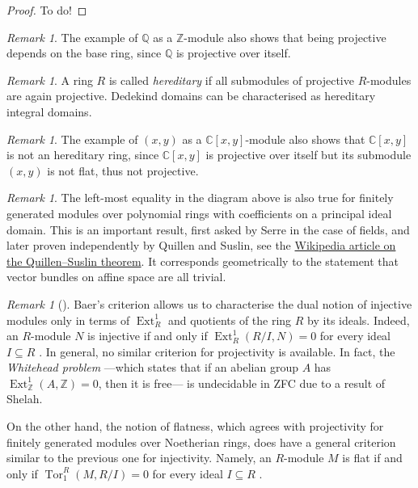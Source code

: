 \documentclass[A4paper, 12pt, british, reqno]{amsart}
\newcommand{\C}{\mathbb{C}} %
\newcommand{\Q}{\mathbb{Q}} %
\newcommand{\Z}{\mathbb{Z}} %
\theoremstyle{plain}
\theoremstyle{definition}
\theoremstyle{remark}
\newtheorem{rem}[thm]{Remark}
\theoremstyle{plain}
\theoremstyle{definition}
\theoremstyle{remark}
\theoremstyle{plain}
\theoremstyle{definition}
\theoremstyle{remark}
\DeclareMathOperator{\Ext}{Ext}
\DeclareMathOperator{\Tor}{Tor}
\begin{document}
{\color{gray}
\begin{proof}
    To do!
\end{proof}
}

\begin{rem}
    The example of $\Q$ as a $\Z$-module also shows that being projective depends on the base ring, since $\Q$ is projective over itself.
\end{rem}

\begin{rem}
    A ring $R$ is called \textit{hereditary} if all submodules of projective $R$-modules are again projective.
    Dedekind domains can be characterised as hereditary integral domains.
\end{rem}

\begin{rem}
    The example of $(x,y)$ as a $\C[x,y]$-module also shows that $\C[x,y]$ is not an hereditary ring, since $\C[x,y]$ is projective over itself but its submodule $(x,y)$ is not flat, thus not projective.
\end{rem}

\begin{rem}
    The left-most equality in the diagram above is also true for finitely generated modules over polynomial rings with coefficients on a principal ideal domain.
    This is an important result, first asked by Serre in the case of fields, and later proven independently by Quillen and Suslin, see the \href{https://en.wikipedia.org/wiki/Quillen-Suslin_theorem}{Wikipedia article on the Quillen--Suslin theorem}.
    It corresponds geometrically to the statement that vector bundles on affine space are all trivial.
\end{rem}

\begin{rem}[{\cite{fra18}}]
    Baer's criterion \cite[Prop.~1.1.1]{fra18} allows us to characterise the dual notion of injective modules only in terms of $\Ext^{1}_{R}$ and quotients of the ring $R$ by its ideals.
    Indeed, an $R$-module $N$ is injective if and only if $\Ext^{1}_{R}(R/I,N)=0$ for every ideal $I\subseteq R$ \cite[Prop.~1.1.4]{fra18}.
    In general, no similar criterion for projectivity is available.
    In fact, the \textit{Whitehead problem} ---which states that if an abelian group $A$ has $\Ext^{1}_{\Z}(A,\Z)=0$, then it is free--- is undecidable in ZFC due to a result of Shelah.

    {\color{gray}
    On the other hand, the notion of flatness, which agrees with projectivity for finitely generated modules over Noetherian rings, does have a general criterion similar to the previous one for injectivity.
    Namely, an $R$-module $M$ is flat if and only if $\Tor_{1}^{R}(M,R/I)=0$ for every ideal $I\subseteq R$ \cite[Prop.~1.2.3]{fra18}.}
\end{rem}
\end{document}
